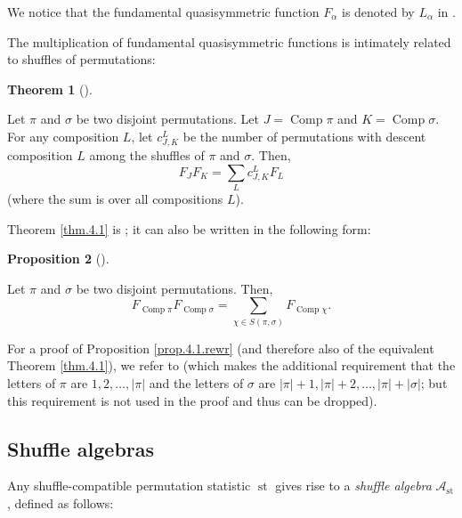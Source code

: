\documentclass[numbers=enddot,12pt,final,onecolumn,notitlepage]{scrartcl}%
\theoremstyle{definition}
\newtheorem{theo}{Theorem}[section]
\newenvironment{theorem}[1][]
{\begin{theo}[#1]\begin{leftbar}}
{\end{leftbar}\end{theo}}
\newtheorem{prop}[theo]{Proposition}
\newenvironment{proposition}[1][]
{\begin{prop}[#1]\begin{leftbar}}
{\end{leftbar}\end{prop}}
\let\sumnonlimits\sum
\renewcommand{\sum}{\sumnonlimits\limits}
\begin{document}
We notice that the fundamental quasisymmetric function $F_{\alpha}$ is denoted
by $L_{\alpha}$ in \cite[\S 5.2]{HopfComb}.

The multiplication of fundamental quasisymmetric functions is intimately
related to shuffles of permutations:

\begin{theorem}
\label{thm.4.1}Let $\pi$ and $\sigma$ be two disjoint permutations. Let
$J=\operatorname*{Comp}\pi$ and $K=\operatorname*{Comp}\sigma$. For any
composition $L$, let $c_{J,K}^{L}$ be the number of permutations with descent
composition $L$ among the shuffles of $\pi$ and $\sigma$. Then,%
\[
F_{J}F_{K}=\sum_{L}c_{J,K}^{L}F_{L}%
\]
(where the sum is over all compositions $L$).
\end{theorem}

Theorem \ref{thm.4.1} is \cite[Theorem 4.1]{part1}; it can also be written in
the following form:

\begin{proposition}
\label{prop.4.1.rewr}Let $\pi$ and $\sigma$ be two disjoint permutations.
Then,%
\[
F_{\operatorname*{Comp}\pi}F_{\operatorname*{Comp}\sigma}=\sum_{\chi\in
S\left(  \pi,\sigma\right)  }F_{\operatorname*{Comp}\chi}.
\]

\end{proposition}

For a proof of Proposition \ref{prop.4.1.rewr} (and therefore also of the
equivalent Theorem \ref{thm.4.1}), we refer to \cite[(5.2.6)]{HopfComb} (which
makes the additional requirement that the letters of $\pi$ are $1,2,\ldots
,\left\vert \pi\right\vert $ and the letters of $\sigma$ are $\left\vert
\pi\right\vert +1,\left\vert \pi\right\vert +2,\ldots,\left\vert
\pi\right\vert +\left\vert \sigma\right\vert $; but this requirement is not
used in the proof and thus can be dropped).

\subsection{Shuffle algebras}

Any shuffle-compatible permutation statistic $\operatorname*{st}$ gives rise
to a \textit{shuffle algebra} $\mathcal{A}_{\operatorname*{st}}$, defined as follows:
\end{document}
